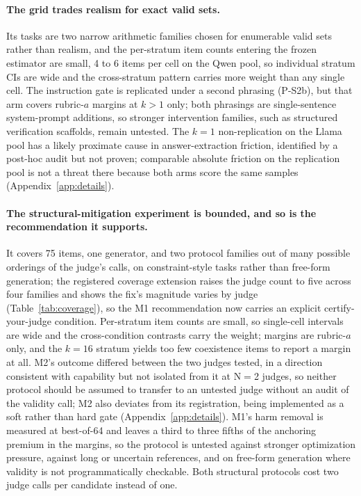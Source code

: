 \documentclass[11pt]{article}
\begin{document}
\paragraph{The grid trades realism for exact valid sets.}
Its tasks are two narrow arithmetic families chosen for enumerable valid sets rather than realism, and the per-stratum item counts entering the frozen estimator are small, 4 to 6 items per cell on the Qwen pool, so individual stratum CIs are wide and the cross-stratum pattern carries more weight than any single cell.
The instruction gate is replicated under a second phrasing (P-S2b), but that arm covers rubric-$a$ margins at $k{>}1$ only; both phrasings are single-sentence system-prompt additions, so stronger intervention families, such as structured verification scaffolds, remain untested.
The $k{=}1$ non-replication on the Llama pool has a likely proximate cause in answer-extraction friction, identified by a post-hoc audit but not proven; comparable absolute friction on the replication pool is not a threat there because both arms score the same samples (Appendix~\ref{app:details}).

\paragraph{The structural-mitigation experiment is bounded, and so is the recommendation it supports.}
It covers 75 items, one generator, and two protocol families out of many possible orderings of the judge's calls, on constraint-style tasks rather than free-form generation; the registered coverage extension raises the judge count to five across four families and shows the fix's magnitude varies by judge (Table~\ref{tab:coverage}), so the M1 recommendation now carries an explicit certify-your-judge condition.
Per-stratum item counts are small, so single-cell intervals are wide and the cross-condition contrasts carry the weight; margins are rubric-$a$ only, and the $k{=}16$ stratum yields too few coexistence items to report a margin at all.
M2's outcome differed between the two judges tested, in a direction consistent with capability but not isolated from it at N$=$2 judges, so neither protocol should be assumed to transfer to an untested judge without an audit of the validity call; M2 also deviates from its registration, being implemented as a soft rather than hard gate (Appendix~\ref{app:details}).
M1's harm removal is measured at best-of-64 and leaves a third to three fifths of the anchoring premium in the margins, so the protocol is untested against stronger optimization pressure, against long or uncertain references, and on free-form generation where validity is not programmatically checkable.
Both structural protocols cost two judge calls per candidate instead of one.
\end{document}
